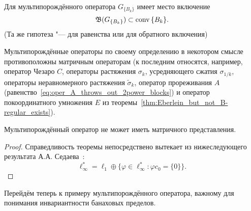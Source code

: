 \begin{hypothesis}
	Для мультипорождённого оператора $G_{\{B_k\}}$ имеет место включение
	\begin{equation}
		\mathfrak{B} (G_{\{B_k\}}) \subset \operatorname{conv} {\{B_k\}}
		.
	\end{equation}
	(Та же гипотеза "--- для равенства или для обратного включения)
\end{hypothesis}

\begin{remark}
	Мультипорождённые операторы по своему определению в некотором смысле противоположны матричным операторам
	(к последним относятся, например, оператор Чезаро $C$, операторы растяжения $\sigma_k$, усредняющего сжатия $\sigma_{1/k}$,
	операторы неравномерного растяжения $\tilde\sigma_k$, оператор прореживания $A$ (равенство~\eqref{eq:oper_A_throws_out_2power_blocks}) и оператор покоординатного умножения $E$ из теоремы~\ref{thm:Eberlein_but_not_B-regular_exists}).
\end{remark}

\begin{theorem}
	Мультипорождённый оператор не может иметь матричного представления.
\end{theorem}

\begin{proof}
	Справедливость теоремы непосредствено вытекает из нижеследующего результата А.А. Седаева~\cite[\S 6.3]{sedaev2009_doc_vgasu}:
	\begin{equation}
		\ell_\infty^* = \ell_1 \oplus \{\varphi \in\ell_\infty^* : \varphi c_0 = \{0\}\}
		.
	\end{equation}
\end{proof}

Перейдём теперь к примеру мультипорождённого оператора, важному для понимания инвариантности банаховых пределов.

